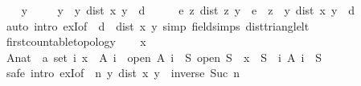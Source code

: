 \begin{isabellebody}
\ \ \isamarkupfalse%
\ y\isanewline
\ \ \isamarkupfalse%
\ {\isacharasterisk}{\kern0pt}{\isacharcolon}{\kern0pt}\ {\isachardoublequoteopen}y\ {\isasymin}\ {\isacharbraceleft}{\kern0pt}y{\isachardot}{\kern0pt}\ dist\ x\ y\ {\isacharless}{\kern0pt}\ d{\isacharbraceright}{\kern0pt}{\isachardoublequoteclose}\isanewline
\ \ \isamarkupfalse%
\ \isamarkupfalse%
\ {\isachardoublequoteopen}{\isasymexists}e{\isachargreater}{\kern0pt}{}{\isachardot}{\kern0pt}\ {\isasymforall}z{\isachardot}{\kern0pt}\ dist\ z\ y\ {\isacharless}{\kern0pt}\ e\ {\isasymlongrightarrow}\ z\ {\isasymin}\ {\isacharbraceleft}{\kern0pt}y{\isachardot}{\kern0pt}\ dist\ x\ y\ {\isacharless}{\kern0pt}\ d{\isacharbraceright}{\kern0pt}{\isachardoublequoteclose}\isanewline
\ \ \ \ \isamarkupfalse%
\ {\isacharparenleft}{\kern0pt}auto\ intro{\isacharbang}{\kern0pt}{\isacharcolon}{\kern0pt}\ exI{\isacharbrackleft}{\kern0pt}of\ {\isacharunderscore}{\kern0pt}\ {\isachardoublequoteopen}d\ {\isacharminus}{\kern0pt}\ dist\ x\ y{\isachardoublequoteclose}{\isacharbrackright}{\kern0pt}\ simp{\isacharcolon}{\kern0pt}\ field{\isacharunderscore}{\kern0pt}simps\ dist{\isacharunderscore}{\kern0pt}triangle{\isacharunderscore}{\kern0pt}lt{\isacharparenright}{\kern0pt}\isanewline
{}\isamarkupfalse%
%
\endisatagproof
{\isafoldproof}%
%
\isadelimproof
\isanewline
%
\endisadelimproof
\isanewline
{}\isamarkupfalse%
\ first{\isacharunderscore}{\kern0pt}countable{\isacharunderscore}{\kern0pt}topology\isanewline
%
\isadelimproof
%
\endisadelimproof
%
\isatagproof
{}\isamarkupfalse%
\isanewline
\ \ \isamarkupfalse%
\ x\isanewline
\ \ \isamarkupfalse%
\ {\isachardoublequoteopen}{\isasymexists}A{\isacharcolon}{\kern0pt}{\isacharcolon}{\kern0pt}nat\ {\isasymRightarrow}\ {\isacharprime}{\kern0pt}a\ set{\isachardot}{\kern0pt}\ {\isacharparenleft}{\kern0pt}{\isasymforall}i{\isachardot}{\kern0pt}\ x\ {\isasymin}\ A\ i\ {\isasymand}\ open\ {\isacharparenleft}{\kern0pt}A\ i{\isacharparenright}{\kern0pt}{\isacharparenright}{\kern0pt}\ {\isasymand}\ {\isacharparenleft}{\kern0pt}{\isasymforall}S{\isachardot}{\kern0pt}\ open\ S\ {\isasymand}\ x\ {\isasymin}\ S\ {\isasymlongrightarrow}\ {\isacharparenleft}{\kern0pt}{\isasymexists}i{\isachardot}{\kern0pt}\ A\ i\ {\isasymsubseteq}\ S{\isacharparenright}{\kern0pt}{\isacharparenright}{\kern0pt}{\isachardoublequoteclose}\isanewline
\ \ \isamarkupfalse%
\ {\isacharparenleft}{\kern0pt}safe\ intro{\isacharbang}{\kern0pt}{\isacharcolon}{\kern0pt}\ exI{\isacharbrackleft}{\kern0pt}of\ {\isacharunderscore}{\kern0pt}\ {\isachardoublequoteopen}{\isasymlambda}n{\isachardot}{\kern0pt}\ {\isacharbraceleft}{\kern0pt}y{\isachardot}{\kern0pt}\ dist\ x\ y\ {\isacharless}{\kern0pt}\ inverse\ {\isacharparenleft}{\kern0pt}Suc\ n{\isacharparenright}{\kern0pt}{\isacharbraceright}{\kern0pt}{\isachardoublequoteclose}{\isacharbrackright}{\kern0pt}{\isacharparenright}{\kern0pt}\isanewline

\end{isabellebody}
